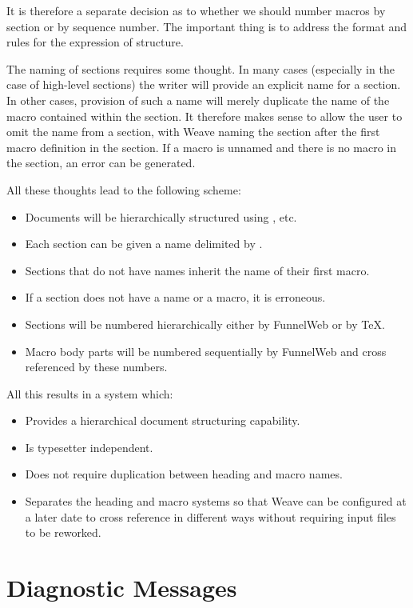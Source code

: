 It is therefore a separate decision as to whether we should number macros
by section or by sequence number. The important thing is to address the
format and rules for the expression of structure.

 The naming
of sections requires some thought. In many cases (especially
in the case of high-level sections) the writer will provide an explicit
name for a section. In other cases, provision of such a name will merely
duplicate the name of the macro contained within the section. It therefore
makes sense to allow the user to omit the name from a section, with Weave
naming the section after the first macro definition in the section. If a 
macro is unnamed and there
is no macro in the section, an error can be generated.

All these thoughts lead to the following scheme:

\begin{itemize}
\item Documents will be hierarchically structured using ,  etc.
\item Each section can be given a name delimited by .
\item Sections that do not have names inherit the name of their first macro.
\item If a section does not have a name or a macro, it is erroneous.
\item Sections will be numbered hierarchically either by FunnelWeb or by \TeX{}.
\item Macro body parts will be numbered sequentially by FunnelWeb and cross
  referenced by these numbers.
\end{itemize}

All this results in a system which:

\begin{itemize}

\item Provides a hierarchical document structuring capability.
\item Is typesetter independent.
\item Does not require duplication between heading and macro names.
\item Separates the heading and macro systems so that Weave can be configured
  at a later date to cross reference in different ways without requiring
  input files to be reworked.
\end{itemize}

\section{Diagnostic Messages}

